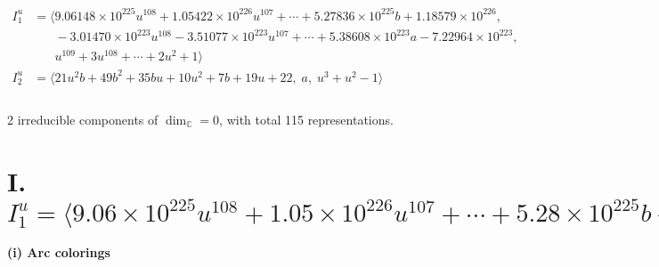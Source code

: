\documentclass[1p]{elsarticle_modified}
\theoremstyle{definition}
\begin{document}
\begin{align*}
I^u_{1}&=\langle 
9.06148\times10^{225} u^{108}+1.05422\times10^{226} u^{107}+\cdots+5.27836\times10^{225} b+1.18579\times10^{226},\\
\phantom{I^u_{1}}&\phantom{= \langle  }-3.01470\times10^{223} u^{108}-3.51077\times10^{223} u^{107}+\cdots+5.38608\times10^{223} a-7.22964\times10^{223},\\
\phantom{I^u_{1}}&\phantom{= \langle  }u^{109}+3 u^{108}+\cdots+2 u^2+1\rangle \\
I^u_{2}&=\langle 
21 u^2 b+49 b^2+35 b u+10 u^2+7 b+19 u+22,\;a,\;u^3+u^2-1\rangle \\
\\
\end{align*}
\raggedright * 2 irreducible components of $\dim_{\mathbb{C}}=0$, with total 115 representations.\\
\newpage
\renewcommand{\arraystretch}{1}
\centering \section*{I. $I^u_{1}= \langle 9.06\times10^{225} u^{108}+1.05\times10^{226} u^{107}+\cdots+5.28\times10^{225} b+1.19\times10^{226},\;-3.01\times10^{223} u^{108}-3.51\times10^{223} u^{107}+\cdots+5.39\times10^{223} a-7.23\times10^{223},\;u^{109}+3 u^{108}+\cdots+2 u^2+1 \rangle$}
\flushleft \textbf{(i) Arc colorings}\\
\end{document}

